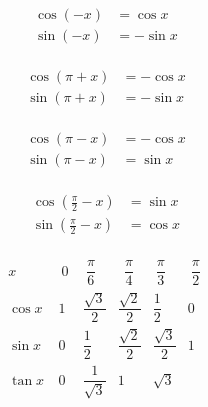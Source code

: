 \begin{frame}

\begin{minipage}{0.60\textwidth}
\end{minipage}
\begin{minipage}{0.39\textwidth}
\begin{align*}
\cos (-x) &= \cos x \\
\sin (-x) &= -\sin x \\  
\end{align*} 
\end{minipage}
\end{frame}

\begin{frame}
\begin{minipage}{0.32\textwidth}
\begin{align*}
\cos (\pi + x) &= -\cos x \\
\sin (\pi + x) &= -\sin x \\  
\end{align*}  
\end{minipage}
\begin{minipage}{0.32\textwidth}
\begin{align*}
\cos (\pi - x) &= -\cos x \\
\sin (\pi - x) &= \sin x \\  
\end{align*}  
\end{minipage}
\begin{minipage}{0.32\textwidth}
\begin{align*}
\cos (\frac\pi2 - x) &= \sin x \\
\sin (\frac\pi2 - x) &= \cos x \\  
\end{align*}  
\end{minipage}

  
\end{frame}


\begin{frame}
\vfil
\begin{minipage}{0.5\textwidth}
{
\renewcommand{\arraystretch}{2.5}
\footnotesize
$$
\begin{array}{c|*{5}{c}}
   x      & \  0 \ & \ \dfrac\pi6 \ & \ \ \dfrac\pi 4\  \ 
& \ \dfrac \pi 3\  &\  \dfrac \pi 2\  \\
\hline
\cos x  \ & 1 & \dfrac{\sqrt3}{2} & \dfrac{\sqrt2}{2} & \dfrac12 & 0 \\
\hline
\sin x  \ & 0 &\dfrac{1}{2} & \dfrac{\sqrt2}{2} & \dfrac{\sqrt3}{2} & 1\\
\hline
\tan x  \ & 0 & \dfrac{1}{\sqrt{3}} & 1 & \sqrt{3} & 
\end{array}
$$
}   
\end{minipage}
\begin{minipage}{0.49\textwidth}
\end{minipage}




\end{frame}




